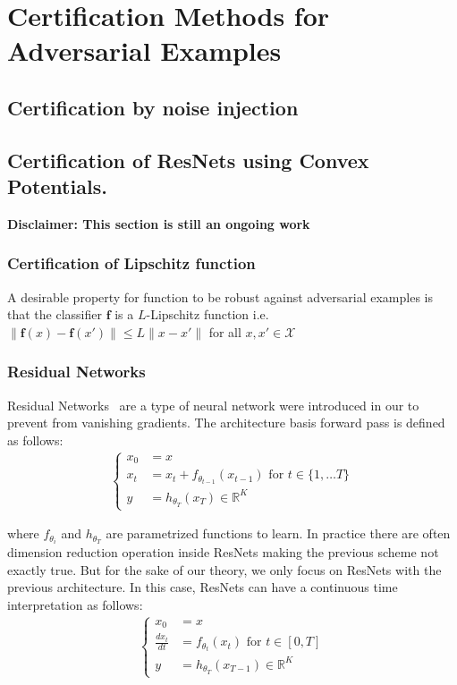 \chapter{Certification Methods for Adversarial Examples}
\minitoc

\section{Certification by noise injection}

\section{Certification of ResNets using Convex Potentials.}
\textbf{Disclaimer: This section is still an ongoing work}
\subsection{Certification of Lipschitz function}
A desirable property for function to be robust against adversarial examples is that the classifier $\mathbf{f}$ is a $L$-Lipschitz function i.e. $\lVert \mathbf{f}(x)-\mathbf{f}(x')\rVert\leq L\lVert x-x'\rVert$ for all $x,x'\in\mathcal{X}$
\subsection{Residual Networks}

Residual Networks~\citep{He_2016_CVPR} are a type of neural network were introduced in our to prevent from vanishing gradients. The architecture basis forward pass is defined as follows:
\begin{align*}
    \left\{
    \begin{array}{ll}
    x_0 &= x\\
    x_{t}& = x_t+f_{\theta_{t-1}}(x_{t-1})\text{ for } t\in\{1,\dots T\}\\
    y &= h_{\theta_T}(x_{T})\in \mathbb{R}^K
  \end{array}
    \right.
\end{align*}

where $f_{\theta_{i}}$ and $h_{\theta_T}$ are parametrized functions to learn. In practice there are often dimension reduction operation inside ResNets making the previous scheme not exactly true. But for the sake of our theory, we only focus on ResNets with the previous architecture. In this case, ResNets can have a continuous time interpretation as follows:
\begin{align*}
        \left\{
    \begin{array}{ll}
    x_0 &= x\\
    \frac{dx_{t}}{dt} &= f_{\theta_{t}}(x_{t})\text{ for } t\in[0, T]\\
    y &= h_{\theta_T}(x_{T-1})\in \mathbb{R}^K
  \end{array}
    \right.
\end{align*}

